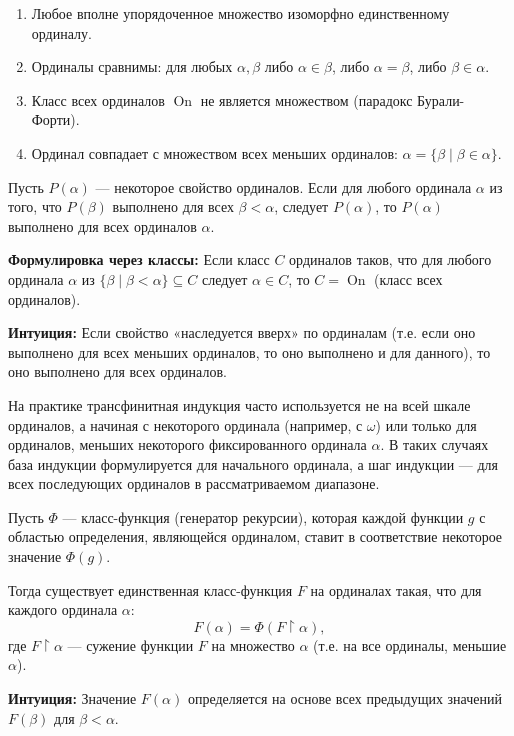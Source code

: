 \documentclass[11pt, a4paper]{extarticle}
\newcommand{\al}{\alpha}
\newcommand{\be}{\beta}
\newcommand{\om}{\omega}
\newcommand{\On}{\mathop{\mathrm{On}}}
\begin{document}
\begin{theorem}
\begin{enumerate}
    \item Любое вполне упорядоченное множество изоморфно единственному ординалу.
    \item Ординалы сравнимы: для любых $\al, \be$ либо $\al \in \be$, либо $\al = \be$, либо $\be \in \al$.
    \item Класс всех ординалов $\On$ не является множеством (парадокс Бурали-Форти).
    \item Ординал совпадает с множеством всех меньших ординалов: $\al = \{\be \mid \be \in \al\}$.
\end{enumerate}
\end{theorem}

\begin{theorem}
Пусть $P(\al)$ — некоторое свойство ординалов. Если для любого ординала $\al$ из того, что $P(\be)$ выполнено для всех $\be < \al$, следует $P(\al)$, то $P(\al)$ выполнено для всех ординалов $\al$.

\textbf{Формулировка через классы:} Если класс $C$ ординалов таков, что для любого ординала $\al$ из $\{\be \mid \be < \al\} \subseteq C$ следует $\al \in C$, то $C = \On$ (класс всех ординалов).

\textbf{Интуиция:} Если свойство «наследуется вверх» по ординалам (т.е. если оно выполнено для всех меньших ординалов, то оно выполнено и для данного), то оно выполнено для всех ординалов.
\end{theorem}

\begin{remark}
На практике трансфинитная индукция часто используется не на всей шкале ординалов, а начиная с некоторого ординала (например, с $\om$) или только для ординалов, меньших некоторого фиксированного ординала $\al$. В таких случаях база индукции формулируется для начального ординала, а шаг индукции — для всех последующих ординалов в рассматриваемом диапазоне.
\end{remark}

\begin{theorem}
Пусть $\Phi$ — класс-функция (генератор рекурсии), которая каждой функции $g$ с областью определения, являющейся ординалом, ставит в соответствие некоторое значение $\Phi(g)$.

Тогда существует единственная класс-функция $F$ на ординалах такая, что для каждого ординала $\al$:
$$F(\al) = \Phi(F \upharpoonright \al),$$
где $F \upharpoonright \al$ — сужение функции $F$ на множество $\al$ (т.е. на все ординалы, меньшие $\al$).

\textbf{Интуиция:} Значение $F(\al)$ определяется на основе всех предыдущих значений $F(\be)$ для $\be < \al$.
\end{theorem}
\end{document}
